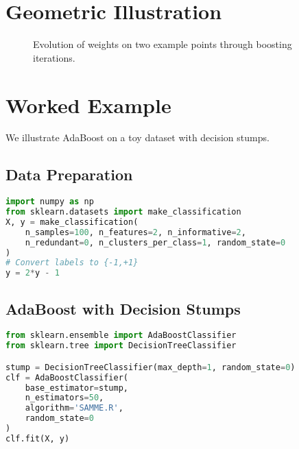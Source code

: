 \documentclass[11pt]{article}
\begin{document}
\section{Geometric Illustration}
\begin{figure}[h]
\centering
{}
\caption{Evolution of weights on two example points through boosting iterations.}
\end{figure}

\section{Worked Example}
We illustrate AdaBoost on a toy dataset with decision stumps.

\subsection{Data Preparation}
\begin{lstlisting}[language=Python]
import numpy as np
from sklearn.datasets import make_classification
X, y = make_classification(
    n_samples=100, n_features=2, n_informative=2,
    n_redundant=0, n_clusters_per_class=1, random_state=0
)
# Convert labels to {-1,+1}
y = 2*y - 1
\end{lstlisting}

\subsection{AdaBoost with Decision Stumps}
\begin{lstlisting}[language=Python]
from sklearn.ensemble import AdaBoostClassifier
from sklearn.tree import DecisionTreeClassifier

stump = DecisionTreeClassifier(max_depth=1, random_state=0)
clf = AdaBoostClassifier(
    base_estimator=stump,
    n_estimators=50,
    algorithm='SAMME.R',
    random_state=0
)
clf.fit(X, y)
\end{lstlisting}
\end{document}
